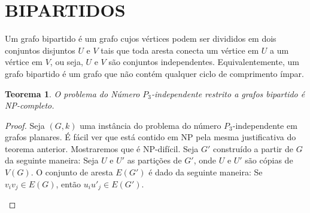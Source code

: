 \documentclass[a4paper,8pt]{article}
\theoremstyle{plain}
\newtheorem{theorem}{Teorema}[section]
\begin{document}
\section{BIPARTIDOS}
 Um grafo bipartido  é um grafo cujos vértices podem ser divididos em dois conjuntos disjuntos $U$ e $V$ tais que toda aresta conecta um vértice em $U$ a um vértice em $V$, ou seja, $U$ e $V$ são conjuntos independentes. Equivalentemente, um grafo bipartido é um grafo que não contém qualquer ciclo de comprimento ímpar. 
\begin{theorem}
 O problema do Número $P_3$-independente restrito a grafos bipartido é NP-completo.  
\end{theorem}

\begin{proof}
Seja $(G,k)$ uma instância do problema do número $P_3$-independente em grafos planares. É fácil ver que está contido em NP pela mesma justificativa do teorema anterior. Mostraremos que é NP-difícil. Seja $G'$ construído a partir de $G$ da seguinte maneira:
Seja $U$ e $U'$ as partições de $G'$, onde $U$ e $U'$ são cópias de $V(G)$. O conjunto de aresta $E(G')$ é dado da seguinte maneira: Se $v_iv_j \in E(G)$, então $ u_iu'_j\in E(G')$. 

\begin{figure}[h]
    \centering

\end{figure}
\end{proof}
\end{document}
